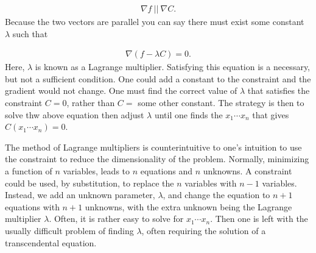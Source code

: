 \documentclass[letterpaper,10pt,english]{sphinxmanual}
\begin{document}
\begin{equation*}
\begin{split}
\begin{equation}
\nabla f ~||~ \nabla C.
\label{_auto93} \tag{129}
\end{equation}
\end{split}
\end{equation*}
Because the two vectors are parallel you can say there must exist some
constant \(\lambda\) such that




\begin{equation*}
\begin{split}
\begin{equation}
\nabla(f-\lambda C)=0.
\label{_auto94} \tag{130}
\end{equation}
\end{split}
\end{equation*}
Here, \(\lambda\) is known as a Lagrange multiplier. Satisfying
this equation  is a necessary, but not a sufficient
condition. One could add a constant to the constraint and the gradient
would not change. One must find the correct value of \(\lambda\) that
satisfies the constraint \(C=0\), rather than \(C=\) some other
constant. The strategy is then to solve
thw above equation  then adjust \(\lambda\) until one
finds the \(x_1\cdots x_n\) that gives \(C(x_1\cdots x_n)=0\).

The method of Lagrange multipliers is counter\sphinxhyphen{}intuitive to one’s
intuition to use the constraint to reduce the dimensionality of the
problem. Normally, minimizing a function of \(n\) variables, leads to
\(n\) equations and \(n\) unknowns. A constraint could be used, by
substitution, to replace the \(n\) variables with \(n-1\)
variables. Instead, we add an unknown parameter, \(\lambda\), and change
the equation to \(n+1\) equations with \(n+1\) unknowns, with the extra
unknown being the Lagrange multiplier \(\lambda\). Often, it is rather
easy to solve for \(x_1\cdots x_n\). Then one is left with the usually
difficult problem of finding \(\lambda\), often requiring the solution
of a transcendental equation.
\end{document}
